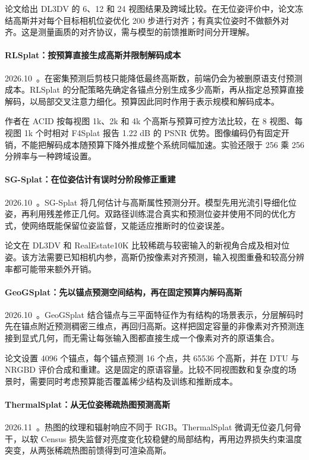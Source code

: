 论文给出 DL3DV 的 6、12 和 24 视图结果及跨域比较。在无位姿评价中，论文冻结高斯并对每个目标相机位姿优化 200 步进行对齐；有真实位姿时不做额外对齐。这是测量画质的对齐协议，需与模型的前馈推断时间分开理解。

\paragraph{RLSplat：按预算直接生成高斯并限制解码成本}
2026.10~\cite{2610_27712}。在密集预测后剪枝只能降低最终高斯数，前端仍会为被删原语支付预测成本。RLSplat 的分配策略先确定各锚点分别生成多少高斯，再从指定总预算直接解码，以局部交叉注意力细化。预算因此同时作用于表示规模和解码成本。

作者在 ACID 按每视图 1k、2k 和 4k 个高斯与预算可控方法比较，在 8 视图、每视图 1k 个时相对 F4Splat 报告 1.22 dB 的 PSNR 优势。图像编码仍有固定开销，不能把解码成本随预算下降外推成整个系统同幅加速。实验还限于 256 乘 256 分辨率与一种跨域设置。

\paragraph{SG-Splat：在位姿估计有误时分阶段修正重建}
2026.10~\cite{2610_35361}。SG-Splat 将几何估计与高斯属性预测分开。模型先用光流引导细化位姿，再利用残差修正几何。双路径训练混合真实和预测位姿并使用不同的优化方式，使网络既能保留位姿监督，又能适应推断时的位姿误差。

论文在 DL3DV 和 RealEstate10K 比较稀疏与较密输入的新视角合成及相对位姿。该方法需要已知相机内参，高斯仍按像素对齐预测，输入视图重叠和较高分辨率都可能带来额外开销。

\paragraph{GeoGSplat：先以锚点预测空间结构，再在固定预算内解码高斯}
2026.10~\cite{2610_36760}。GeoGSplat 结合锚点与三平面特征作为有结构的场景表示，分层解码时先在锚点附近预测稠密三维点，再回归高斯。这样把固定容量的非像素对齐预测连接到显式几何，而无需让每张输入图都直接生成一个像素对齐的原语集合。

论文设置 4096 个锚点，每个锚点预测 16 个点，共 65536 个高斯，并在 DTU 与 NRGBD 评价合成和重建。这是固定的原语容量。比较不同视图数和复杂度的场景时，需要同时考虑预算能否覆盖稀少结构及训练和推断成本。

\paragraph{ThermalSplat：从无位姿稀疏热图预测高斯}
2026.11~\cite{2611_15435}。热图的纹理和辐射响应不同于 RGB。ThermalSplat 微调无位姿几何骨干，以软 Census 损失监督对亮度变化较稳健的局部结构，再用边界损失约束温度突变，从两张稀疏热图前馈得到可渲染高斯。

